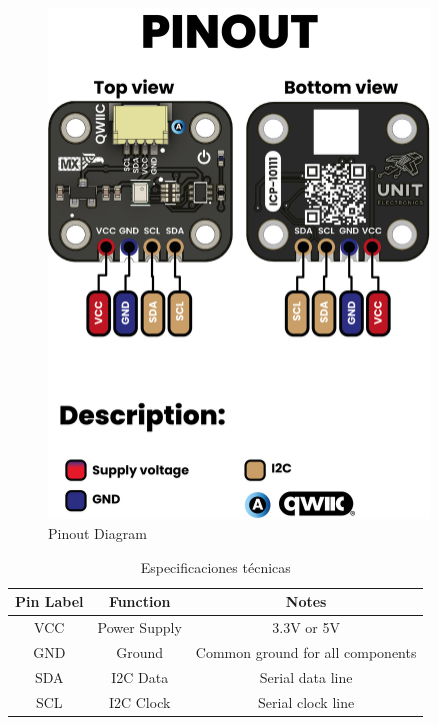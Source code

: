 \documentclass[11pt,a4paper]{article}
\begin{document}
\begin{figure}[H]
\centering
\includegraphics[width=0.9\textwidth]{en_unit_pinout_v_0_0_1_ue0094_icp10111_barometric_pressure_sensor_en.jpg}
\caption{Pinout Diagram}
\label{fig:en-unit-pinout-v-0-0-1-ue0094-icp10111-barometric-pressure-sensor-en-jpg}
\end{figure}




\begin{table}[H]
\centering
\small
\begin{tabular}{|c|c|c|}
\hline
Pin Label & Function & Notes \\
\hline
VCC & Power Supply & 3.3V or 5V \\
GND & Ground & Common ground for all components \\
SDA & I2C Data & Serial data line \\
SCL & I2C Clock & Serial clock line \\
\hline
\end{tabular}
\caption{Especificaciones técnicas}
\end{table}
\end{document}
